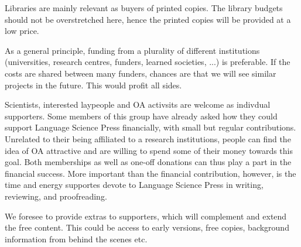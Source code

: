 \documentclass[nonflat,smallfont
]{langsci/langscibook}
\begin{document}
{Libraries are mainly relevant as buyers of printed copies. The library budgets should not be overstretched here, hence the printed copies will be provided at a low price. 

As a general principle, funding from a plurality of different institutions (universities, research centres, funders, learned societies, ...) is preferable. If the costs are shared between many funders, chances are that we will see similar projects in the future. This would profit all sides.

Scientists, interested laypeople and OA activsits are welcome as indivdual supporters. Some members of this group have already asked how they could support Language Science Press financially, with small but regular contributions. Unrelated to their being affiliated to a research institutions, people can find the idea of OA attractive and are willing to spend some of their money towards this goal. Both memberships as well as one-off donations can thus play a part in the financial success. More important than the financial contribution, however, is the time and energy supportes devote to Language Science Press in writing, reviewing, and proofreading.

We foresee to provide extras to supporters, which will complement and extend the free content. This could be access to early versions, free copies, background information from behind the scenes etc. 
}
\end{document}
